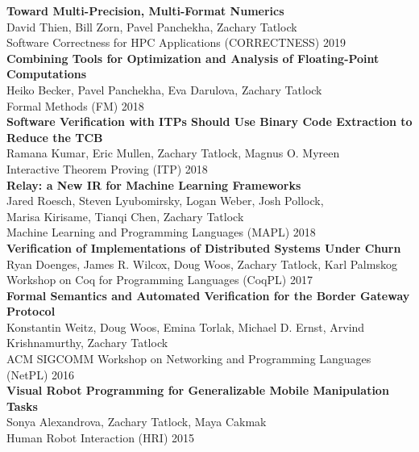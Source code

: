 \documentclass[10pt]{article}
\begin{document}
\textbf{%
Toward Multi-Precision, Multi-Format Numerics
} \\
David Thien, Bill Zorn, Pavel Panchekha, Zachary Tatlock \\
Software Correctness for HPC Applications (CORRECTNESS) 2019 \\

\textbf{%
Combining Tools for Optimization and Analysis of Floating-Point Computations
} \\
Heiko Becker, Pavel Panchekha, Eva Darulova, Zachary Tatlock \\
Formal Methods (FM) 2018 \\

\textbf{%
Software Verification with ITPs Should Use Binary Code Extraction to Reduce the TCB
} \\
Ramana Kumar, Eric Mullen, Zachary Tatlock, Magnus O. Myreen \\
Interactive Theorem Proving (ITP) 2018 \\

\textbf{%
Relay: a New IR for Machine Learning Frameworks
} \\
Jared Roesch, Steven Lyubomirsky, Logan Weber, Josh Pollock, \\
Marisa Kirisame, Tianqi Chen, Zachary Tatlock \\
Machine Learning and Programming Languages (MAPL) 2018 \\

\textbf{%
Verification of Implementations of Distributed Systems Under Churn
} \\
Ryan Doenges, James R. Wilcox, Doug Woos, Zachary Tatlock, Karl Palmskog \\
Workshop on Coq for Programming Languages (CoqPL) 2017 \\

\textbf{%
Formal Semantics and Automated Verification for the Border Gateway Protocol
} \\
Konstantin Weitz, Doug Woos, Emina Torlak, Michael D. Ernst, Arvind Krishnamurthy, Zachary Tatlock \\
ACM SIGCOMM Workshop on Networking and Programming Languages (NetPL) 2016 \\

\textbf{%
Visual Robot Programming for Generalizable Mobile Manipulation Tasks
} \\
Sonya Alexandrova, Zachary Tatlock, Maya Cakmak \\
Human Robot Interaction (HRI) 2015 \\
\end{document}
